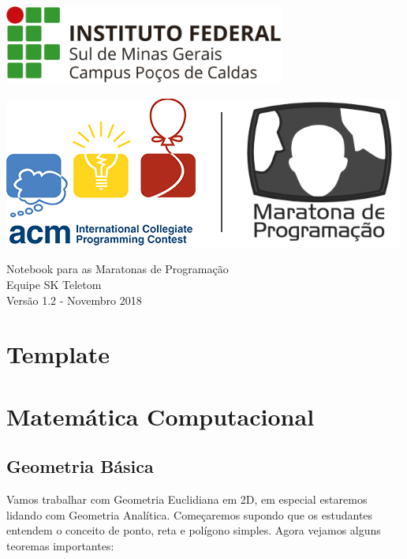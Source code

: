 \documentclass[a4paper,12pt]{article}
\begin{document}
\begin{center}
\begin{center}
  \includegraphics[width=350]{figures/logo_if_horizontal.jpg}
\end{center}
\vspace{7cm}
\begin{center}
  \includegraphics[width=\linewidth/2]{figures/logo_icpc_mdp.png}
\end{center}
\Large{Notebook para as Maratonas de Programação}\\
\large{Equipe SK Teletom}\\
\vspace{9cm}
\large{Versão 1.2 - Novembro 2018}
\end{center}

\newpage
\tableofcontents
\thispagestyle{empty}

\newpage
\section{Template}

\newpage
\section{Matemática Computacional}

\subsection{Geometria Básica}
Vamos trabalhar com Geometria Euclidiana em 2D, em especial estaremos lidando com Geometria Analítica. Começaremos supondo que os estudantes entendem o conceito de ponto, reta e polígono simples. Agora vejamos alguns teoremas importantes:
\end{document}
